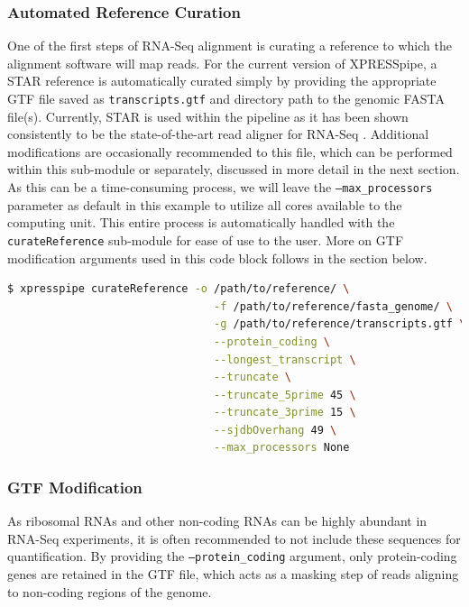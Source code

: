\documentclass[10pt, oneside]{article}
\begin{document}
\subsubsection{Automated Reference Curation}
One of the first steps of RNA-Seq alignment is curating a reference to which the alignment software will map reads. For the current version of XPRESSpipe, a STAR \cite{star} reference is automatically curated simply by providing the appropriate GTF file saved as \texttt{transcripts.gtf} and directory path to the genomic FASTA file(s). Currently, STAR is used within the pipeline as it has been shown consistently to be the state-of-the-art read aligner for RNA-Seq \cite{alignment_benchmark}. Additional modifications are occasionally recommended to this file, which can be performed within this sub-module or separately, discussed in more detail in the next section. As this can be a time-consuming process, we will leave the \texttt{--max\_processors} parameter as default in this example to utilize all cores available to the computing unit. This entire process is automatically handled with the \texttt{curateReference} sub-module for ease of use to the user. More on GTF modification arguments used in this code block follows in the section below.
\newline
\begin{lstlisting}[language=bash, caption=curateReference example]
$ xpresspipe curateReference -o /path/to/reference/ \
                                -f /path/to/reference/fasta_genome/ \
                                -g /path/to/reference/transcripts.gtf \
                                --protein_coding \
                                --longest_transcript \
                                --truncate \
                                --truncate_5prime 45 \
                                --truncate_3prime 15 \
                                --sjdbOverhang 49 \
                                --max_processors None
\end{lstlisting}


\subsubsection{GTF Modification}
As ribosomal RNAs and other non-coding RNAs can be highly abundant in RNA-Seq experiments, it is often recommended to not include these sequences for quantification. By providing the \texttt{--protein\_coding} argument, only protein-coding genes are retained in the GTF file, which acts as a masking step of reads aligning to non-coding regions of the genome. \par
\end{document}
